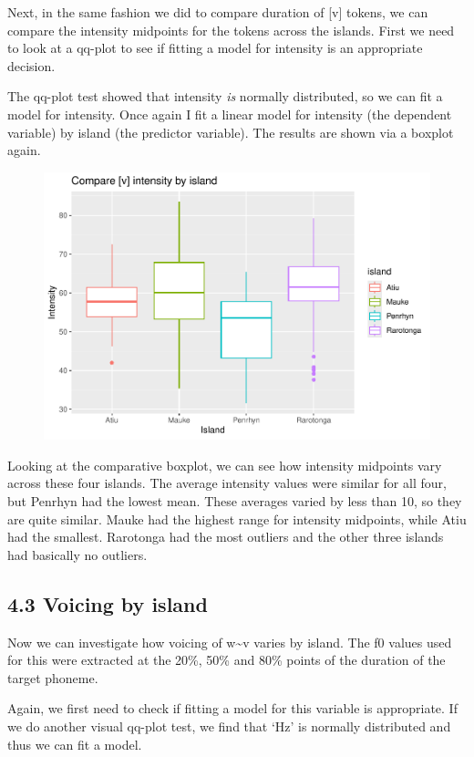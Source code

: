 \documentclass[
  ,man,floatsintext]{apa6}
\begin{document}
Next, in the same fashion we did to compare duration of {[}v{]} tokens, we can compare the intensity midpoints for the tokens across the islands. First we need to look at a qq-plot to see if fitting a model for intensity is an appropriate decision.

The qq-plot test showed that intensity \emph{is} normally distributed, so we can fit a model for intensity. Once again I fit a linear model for intensity (the dependent variable) by island (the predictor variable). The results are shown via a boxplot again.

\begin{figure}
\includegraphics[width=0.75\linewidth]{D1cim_w_v_manuscript_files/figure-latex/print-mod2-1} \caption{ }\label{fig:print-mod2}
\end{figure}

Looking at the comparative boxplot, we can see how intensity midpoints vary across these four islands. The average intensity values were similar for all four, but Penrhyn had the lowest mean. These averages varied by less than 10, so they are quite similar. Mauke had the highest range for intensity midpoints, while Atiu had the smallest. Rarotonga had the most outliers and the other three islands had basically no outliers.

\subsection{4.3 Voicing by island}\label{voicing-by-island}

Now we can investigate how voicing of w\textasciitilde v varies by island. The f0 values used for this were extracted at the 20\%, 50\% and 80\% points of the duration of the target phoneme.

Again, we first need to check if fitting a model for this variable is appropriate. If we do another visual qq-plot test, we find that `Hz' is normally distributed and thus we can fit a model.
\end{document}
